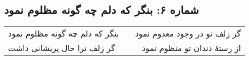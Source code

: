 \begin{center}
\section*{شماره ۶: بنگر که دلم چه گونه مظلوم نمود}
\label{sec:006}
\begin{longtable}{l p{0.5cm} r}
بنگر که دلم چه گونه مظلوم نمود
&&
گر زلف تو در وجود معدوم نمود
\\
گر زلف ترا حال پریشانی داشت
&&
از رستهٔ دندان تو منظوم نمود
\\
\end{longtable}
\end{center}
